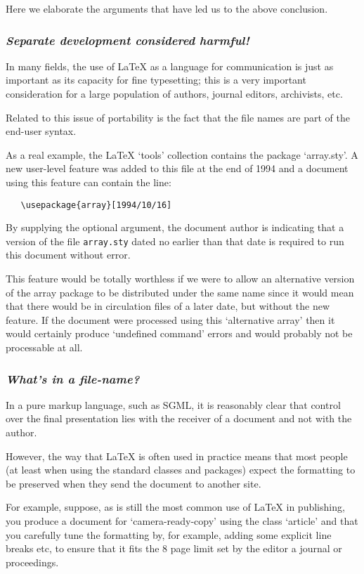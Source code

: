 \documentclass{ltxguide}[1995/11/28]
\newcommand{\reasonsection}[1]{\subsubsection*{\it #1}}
\begin{document}
Here we elaborate the arguments that have led us to the above
conclusion.


\reasonsection{Separate development considered harmful!}
\label{sec:ja}

In many fields, the use of \LaTeX{} as a language for communication
is just as important as its capacity for fine typesetting; this is a
very important consideration for a large population of authors,
journal editors, archivists, etc.

Related to this issue of portability is the fact that the file names
are part of the end-user syntax.

As a real example, the \LaTeX{} `tools' collection contains the
package `array.sty'.  A new user-level feature was added to this file
at the end of 1994 and a document using this feature can contain the
line:
\begin{verbatim}
   \usepackage{array}[1994/10/16]
\end{verbatim}
  
By supplying the optional argument, the document author is indicating
that a version of the file \texttt{array.sty} dated no earlier than
that date is required to run this document without error.

This feature would be totally worthless if we were to allow an
alternative version of the array package to be distributed under the
same name since it would mean that there would be in circulation files
of a later date, but without the new feature.  If the document
were processed using this `alternative array' then it would certainly
produce `undefined command' errors and would probably not be
processable at all.
 

\reasonsection{What's in a file-name?}
\label{sec:jb}

In a pure markup language, such as SGML, it is reasonably clear that
control over the final presentation lies with the receiver of a
document and not with the author.

However, the way that \LaTeX{} is often used in practice means that
most people (at least when using the standard classes and packages)
expect the formatting to be preserved when they send the document to
another site.

For example, suppose, as is still the most common use of \LaTeX{} in
publishing, you produce a document for `camera-ready-copy' using the
class `article' and that you carefully tune the formatting by, for
example, adding some explicit line breaks etc, to ensure that it fits
the 8 page limit set by the editor a journal or proceedings.
\end{document}
